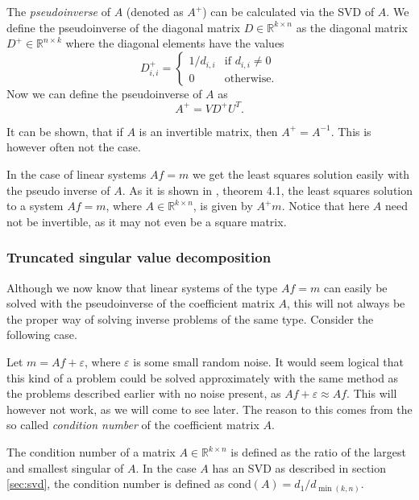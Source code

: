 \documentclass[12pt,a4]{article}
\newcommand{\R}{{\mathbb R}}
\newcommand{\eps}{\varepsilon}
\newcommand{\cond}{\ensuremath{\text{cond}}}
\begin{document}
The \emph{pseudoinverse} of $A$ (denoted as $A^+$) can be calculated via the SVD of $A$. We define the pseudoinverse of the diagonal matrix $D \in \R^{k \times n}$ as the diagonal matrix $D^+ \in \R^{n \times k}$ where the diagonal elements have the values
\begin{equation}
D^+_{i,i} =
\begin{cases}
    1 / d_{i,i} & \text{if }d_{i,i} \neq 0 \\
    0           & \text{otherwise}.
\end{cases}
\end{equation}
Now we can define the pseudoinverse of $A$ as 
\begin{equation}\label{pseudo}
A^+ = V D^+ U^T .
\end{equation}

It can be shown, that if $A$ is an invertible matrix, then $A^+ = A^{-1}$. This is however often not the case.

In the case of linear systems $Af = m$ we get the least squares solution easily with the pseudo inverse of $A$. As it is shown in \cite{samu}, theorem 4.1, the least squares solution to a system $Af = m$, where $A \in \R^{k \times n}$, is given by $A^+ m$. Notice that here $A$ need not be invertible, as it may not even be a square matrix.

\subsubsection{Truncated singular value decomposition}

Although we now know that linear systems of the type $Af = m$ can easily be solved with the pseudoinverse of the coefficient matrix $A$, this will not always be the proper way of solving inverse problems of the same type. Consider the following case.

Let $m = A f + \eps$, where $\eps$ is some small random noise. It would seem logical that this kind of a problem could be solved approximately with the same method as the problems described earlier with no noise present, as $Af + \eps \approx Af$. This will however not work, as we will come to see later. The reason to this comes from the so called \emph{condition number} of the coefficient matrix $A$.

The condition number of a matrix $A \in \R^{k \times n}$ is defined as the ratio of the largest and smallest singular of $A$. In the case $A$ has an SVD as described in section \ref{sec:svd}, the condition number is defined as $\cond(A) = d_1 / d_{\min(k,n)}$.
\end{document}

